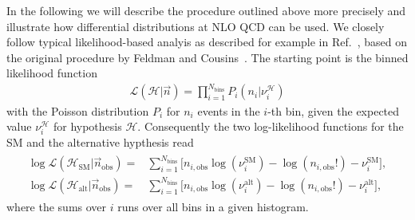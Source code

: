 \documentclass[preprint]{JHEP3}
\newcommand{\SM}{\mathrm{SM}}
\newcommand{\alt}{\mathrm{alt}}
\def\HSM{\mathcal{H}_{\mathrm{SM}}}
\def\Halt{\mathcal{H}_{\mathrm{alt}}}
\newcommand{\be}{\begin{eqnarray}}
\newcommand{\ee}{\end{eqnarray}}
\begin{document}
In the following we will describe the procedure outlined above more precisely and illustrate how differential distributions at NLO QCD can be used.
We closely follow typical likelihood-based analyis as described for example in Ref.~\cite{Cowan:2010js}, based on the original procedure by 
Feldman and Cousins~\cite{Feldman:1997qc}.
The starting point is the binned likelihood function 
\be
\label{lili}
   \mathcal{L}(\mathcal{H}|\vec{n}) = \prod_{i=1}^{N_\mathrm{bins}} P_i(n_i|\nu_{i}^\mathcal{H})
\ee
with the Poisson distribution $P_i$ for $n_i$ events in the $i$-th bin, given the expected value $\nu_{i}^\mathcal{H}$ for hypothesis $\mathcal{H}$. 
Consequently the two log-likelihood functions for the SM and the alternative hypthesis read
\be
\label{lilifunct}
\begin{split}
  \log\mathcal{L}(\HSM |\vec{n}_\mathrm{obs})  =& \sum_{i=1}^{N_\mathrm{bins}} \bigl[ n_{i,\mathrm{obs}}\log(\nu_i^{\SM}) -\log(n_{i,\mathrm{obs}}!) -\nu_i^{\SM}  \bigr], \\
  \log\mathcal{L}(\Halt|\vec{n}_\mathrm{obs})  =& \sum_{i=1}^{N_\mathrm{bins}} \bigl[ n_{i,\mathrm{obs}}\log(\nu_i^{\alt})-\log(n_{i,\mathrm{obs}}!) -\nu_i^{\alt} \bigr],
\end{split}
\ee
where the sums over $i$ runs over all bins in a given histogram.
\end{document}
